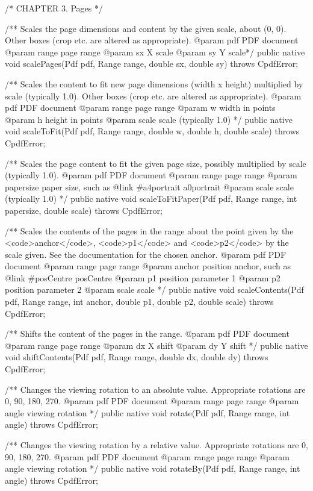 /* CHAPTER 3. Pages */

/** Scales the page dimensions
and content by the given scale, about (0, 0). Other boxes (crop etc. are
altered as appropriate).
@param pdf PDF document
@param range page range
@param sx X scale
@param sy Y scale*/
public native void scalePages(Pdf pdf, Range range, double sx, double sy)
    throws CpdfError;

/** Scales the content to fit new page dimensions (width x height)
multiplied by scale (typically 1.0). Other boxes (crop etc. are altered as
appropriate).
@param pdf PDF document
@param range page range
@param w width in points
@param h height in points
@param scale scale (typically 1.0)
*/
public native void scaleToFit(Pdf pdf, Range range, double w, double h,
                              double scale)
    throws CpdfError;

/** Scales the page content to fit the given page size, possibly multiplied
by scale (typically 1.0).
@param pdf PDF document
@param range page range
@param papersize paper size, such as {@link #a4portrait a0portrait}
@param scale scale (typically 1.0)
*/
public native void scaleToFitPaper(Pdf pdf, Range range, int papersize,
                                   double scale)
    throws CpdfError;

/** Scales the contents of the pages in the range about the point given by
the <code>anchor</code>, <code>p1</code> and <code>p2</code> by the scale
given. See the documentation for the chosen anchor.
@param pdf PDF document
@param range page range
@param anchor position anchor, such as {@link #posCentre posCentre}
@param p1 position parameter 1
@param p2 position parameter 2
@param scale scale
*/
public native void scaleContents(Pdf pdf, Range range, int anchor,
                                 double p1, double p2, double scale)
    throws CpdfError;

/** Shifts the content of the pages in the range.
@param pdf PDF document
@param range page range
@param dx X shift
@param dy Y shift
*/
public native void shiftContents(Pdf pdf, Range range, double dx,
                                 double dy)
    throws CpdfError;

/** Changes the viewing rotation to an absolute value. Appropriate
rotations are 0, 90, 180, 270.
@param pdf PDF document
@param range page range
@param angle viewing rotation
*/
public native void rotate(Pdf pdf, Range range, int angle)
    throws CpdfError;

/** Changes the viewing rotation by a relative value. Appropriate
rotations are 0, 90, 180, 270.
@param pdf PDF document
@param range page range
@param angle viewing rotation
*/
public native void rotateBy(Pdf pdf, Range range, int angle)
    throws CpdfError;

